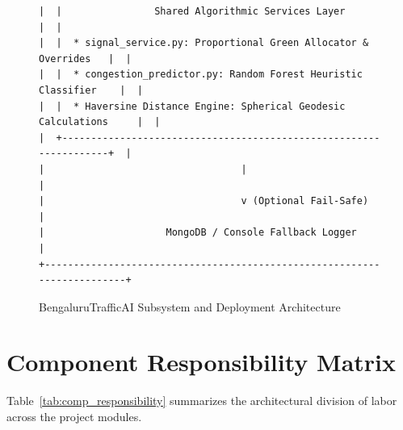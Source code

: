 \documentclass[11pt,a4paper,oneside]{report}
\begin{document}
\begin{figure}[h!]
\begin{tcolorbox}[colback=white,colframe=branddark,arc=2mm,title=\textbf{High-Level Architecture Schematic}]
\begin{verbatim}
|  |                Shared Algorithmic Services Layer                  |  |
|  |  * signal_service.py: Proportional Green Allocator & Overrides   |  |
|  |  * congestion_predictor.py: Random Forest Heuristic Classifier    |  |
|  |  * Haversine Distance Engine: Spherical Geodesic Calculations     |  |
|  +-------------------------------------------------------------------+  |
|                                  |                                      |
|                                  v (Optional Fail-Safe)                 |
|                     MongoDB / Console Fallback Logger                   |
+-------------------------------------------------------------------------+
\end{verbatim}
\end{tcolorbox}
\caption{BengaluruTrafficAI Subsystem and Deployment Architecture}
\label{fig:arch_diagram}
\end{figure}

\section{Component Responsibility Matrix}
Table~\ref{tab:comp_responsibility} summarizes the architectural division of labor across the project modules.
\end{document}
